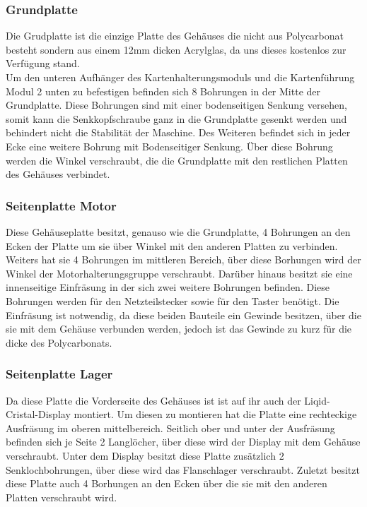 \subsubsection{Grundplatte}
Die Grudplatte ist die einzige Platte des Gehäuses die nicht aus Polycarbonat besteht sondern aus einem 12mm dicken
Acrylglas, da uns dieses kostenlos zur Verfügung stand.\\
Um den unteren Aufhänger des Kartenhalterungsmoduls und die Kartenführung Modul 2 unten zu befestigen befinden sich 8
Bohrungen in der Mitte der Grundplatte. Diese Bohrungen sind mit einer bodenseitigen Senkung versehen, somit kann die
Senkkopfschraube ganz in die Grundplatte gesenkt werden und behindert nicht die Stabilität der Maschine.
Des Weiteren befindet sich in jeder Ecke eine weitere Bohrung mit Bodenseitiger Senkung. Über diese Bohrung werden die
Winkel verschraubt, die die Grundplatte mit den restlichen Platten des Gehäuses verbindet.

\subsubsection{Seitenplatte Motor}
Diese Gehäuseplatte besitzt, genauso wie die Grundplatte, 4 Bohrungen an den Ecken der Platte um sie über Winkel
mit den anderen Platten zu verbinden. Weiters hat sie 4 Bohrungen im mittleren Bereich, über diese Borhungen wird
der Winkel der Motorhalterungsgruppe verschraubt. Darüber hinaus besitzt sie eine innenseitige Einfräsung in der sich
zwei weitere Bohrungen befinden. Diese Bohrungen werden für den Netzteilstecker sowie für den Taster benötigt.
Die Einfräsung ist notwendig, da diese beiden Bauteile ein Gewinde besitzen, über die sie mit dem Gehäuse verbunden werden,
jedoch ist das Gewinde zu kurz für die dicke des Polycarbonats.

\subsubsection{Seitenplatte Lager}
Da diese Platte die Vorderseite des Gehäuses ist ist auf ihr auch der Liqid-Cristal-Display montiert. Um diesen zu montieren
hat die Platte eine rechteckige Ausfräsung im oberen mittelbereich. Seitlich ober und unter der Ausfräsung befinden sich
je Seite 2 Langlöcher, über diese wird der Display mit dem Gehäuse verschraubt.
Unter dem Display besitzt diese Platte zusätzlich 2 Senklochbohrungen, über diese wird das Flanschlager verschraubt.
Zuletzt besitzt diese Platte auch 4 Borhungen an den Ecken über die sie mit den anderen Platten verschraubt wird.

